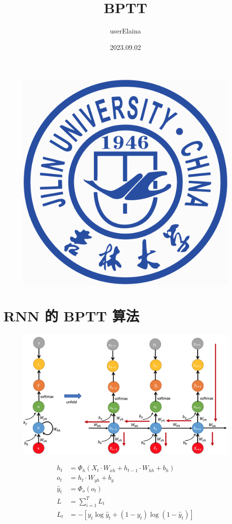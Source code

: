 \documentclass{beamer}
\author{userElaina}
\title{BPTT}
\subtitle{}
\institute{人工智能学院}
\date{2023.09.02}
\begin{document}
\kaishu
\begin{frame}
    \titlepage
    \begin{figure}[htpb]
        \begin{center}
            \includegraphics[width=0.15\linewidth]{pic/Jilin_University_Logo.eps}
        \end{center}
    \end{figure}
\end{frame}

\begin{frame}
    \tableofcontents[sectionstyle=show,subsectionstyle=show/shaded/hide,subsubsectionstyle=show/shaded/hide]
\end{frame}

\section{RNN 的 BPTT 算法}

\begin{frame}
    \begin{figure}[l]
        \centering
        \includegraphics[height=.75\textheight]{pic/bptt.png}
    \end{figure}
\end{frame}

\begin{frame}
    \begin{equation*}
        \begin{aligned}
            h_t &= \Phi_h(X_t\cdot W_{xh}+h_{t−1}\cdot W_{hh}+b_h) \\
            o_t &= h_t\cdot W_{yh}+b_y \\
            \hat{y}_t &= \Phi_o(o_t) \\
            L &= \sum_{i=1}^T L_t \\
            L_t &= -[y_t\log\hat{y}_t+(1-y_t)\log(1-\hat{y}_t)]
        \end{aligned}
    \end{equation*}
\end{frame}
\end{document}

